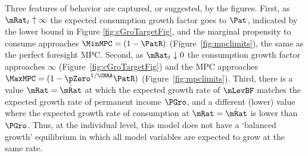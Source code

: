 \documentclass[BufferStockTheory]{subfiles}
\begin{document}
Three features of behavior are captured, or suggested, by the
figures. First, as $\mRat_{t} \uparrow \infty$ the expected
consumption growth factor goes to ${\Pat}$, indicated by the lower
bound in Figure \ref{fig:cGroTargetFig}, and the marginal propensity
to consume approaches $\MinMPC=(1-\PatR)$
(Figure~\ref{fig:mpclimits}), the same as the perfect foresight MPC.  Second, as $\mRat_t \downarrow 0$ the consumption
growth factor approaches $\infty$ (Figure~\ref{fig:cGroTargetFig}) and
the MPC approaches $\MaxMPC=(1-\pZero^{1/\CRRA}\PatR)$ (Figure~\ref{fig:mpclimits}).  Third,
there is a value $\mRat = \hat{\mRat}$ at which the expected growth rate of $\mLevBF$ matches the expected growth rate of permanent income $\PGro$, and a different (lower) value where the expected growth rate of consumption at $\mRat = \hat{\mRat}$ is lower than $\PGro$.  Thus, at the individual level, this model does not have a `balanced growth' equilibrium in which all model variables are expected to grow at the same rate.  
\begin{comment}
Third (Figure \ref{fig:cGroTargetFig}), there are two special values of $\mRat$, which
we will call the `individual balanced growth' point $\mBal$ because it is the point where expected consumption growth and expected permanent income growth are balanced, and the `individual target' $\mTarg$  such that if $\mRat_t = \mTarg$ then $\Ex_t [{\mRat}_{t+1}] = \mRat_t$.  %
of permanent noncapital income.  (The individual consumer does not expect `balanced growth' at $\mTarg$).  

The final proposition suggested by
Figure~\ref{fig:cGroTargetFig} is that the expected consumption growth
factor is declining in the level of the cash-on-hand ratio
$\mRat_{t}$.  This turns out to be true in the absence of permanent
shocks, but in extreme cases it can be false if permanent shocks are
present.\footnote{Throughout the remaining analysis I make a final
  assumption that is not strictly justified by the foregoing.  We have
  seen that the finite-horizon consumption functions
  $\mathring{\cFunc}_{T-n}(\mRat)$ are twice continuously differentiable and
  strictly concave, and that they converge to a continuous function
  $\mathring{\cFunc}(\mRat)$.  It does not strictly follow that the limiting
  function $\mathring{\cFunc}(\mRat)$ is twice continuously differentiable, but I
  will assume that it is.}
\end{comment}
\end{document}
